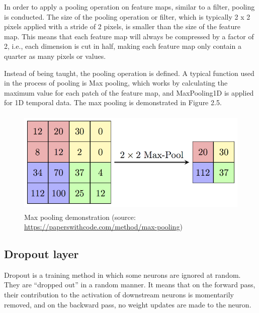 In order to apply a pooling operation on feature maps, similar to a filter, pooling is conducted. The size of the pooling operation or filter, which is typically 2 x 2 pixels applied with a stride of 2 pixels, is smaller than the size of the feature map. This means that each feature map will always be compressed by a factor of 2, i.e., each dimension is cut in half, making each feature map only contain a quarter as many pixels or values.

Instead of being taught, the pooling operation is defined. A typical function used in the process of pooling is Max pooling, which works by calculating the maximum value for each patch of the feature map, and MaxPooling1D is applied for 1D temporal data. The max pooling is demonstrated in Figure 2.5.

\begin{figure}[!h]
	\centering
	\includegraphics[width=\linewidth, height=5cm,keepaspectratio]{figures/maxpooling.png}
   \caption{Max pooling demonstration (source: \url{https://paperswithcode.com/method/max-pooling})}
\end{figure}
\newpage
\subsection{Dropout layer}
\hspace{0.5cm}Dropout is a training method in which some neurons are ignored at random. They are ``dropped out'' in a random manner. It means that on the forward pass, their contribution to the activation of downstream neurons is momentarily removed, and on the backward pass, no weight updates are made to the neuron.

